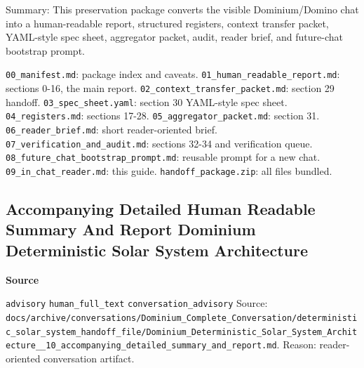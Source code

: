 \documentclass[9pt,a4paper,openany]{book}
\newcommand{\vonecallout}[3]{\par\medskip\noindent\begingroup\setlength{\fboxsep}{7pt}\colorbox{DomCalloutBg}{\parbox{0.94\linewidth}{\textbf{\textcolor{#1}{#2}}\par #3}}\endgroup\par\medskip}
\begin{document}
Summary: This preservation package converts the visible Dominium/\allowbreak{}Domino chat into a human-\allowbreak{}readable report, structured registers, context transfer packet, YAML-\allowbreak{}style spec sheet, aggregator packet, audit, reader brief, and future-\allowbreak{}chat bootstrap prompt.\allowbreak{}


\texttt{00\_\allowbreak{}manifest.\allowbreak{}md}: package index and caveats.\allowbreak{} \texttt{01\_\allowbreak{}human\_\allowbreak{}readable\_\allowbreak{}report.\allowbreak{}md}: sections 0-\allowbreak{}16, the main report.\allowbreak{} \texttt{02\_\allowbreak{}context\_\allowbreak{}transfer\_\allowbreak{}packet.\allowbreak{}md}: section 29 handoff.\allowbreak{} \texttt{03\_\allowbreak{}spec\_\allowbreak{}sheet.\allowbreak{}yaml}: section 30 YAML-\allowbreak{}style spec sheet.\allowbreak{} \texttt{04\_\allowbreak{}registers.\allowbreak{}md}: sections 17-\allowbreak{}28.\allowbreak{} \texttt{05\_\allowbreak{}aggregator\_\allowbreak{}packet.\allowbreak{}md}: section 31.\allowbreak{} \texttt{06\_\allowbreak{}reader\_\allowbreak{}brief.\allowbreak{}md}: short reader-\allowbreak{}oriented brief.\allowbreak{} \texttt{07\_\allowbreak{}verification\_\allowbreak{}and\_\allowbreak{}audit.\allowbreak{}md}: sections 32-\allowbreak{}34 and verification queue.\allowbreak{} \texttt{08\_\allowbreak{}future\_\allowbreak{}chat\_\allowbreak{}bootstrap\_\allowbreak{}prompt.\allowbreak{}md}: reusable prompt for a new chat.\allowbreak{} \texttt{09\_\allowbreak{}in\_\allowbreak{}chat\_\allowbreak{}reader.\allowbreak{}md}: this guide.\allowbreak{} \texttt{handoff\_\allowbreak{}package.\allowbreak{}zip}: all files bundled.\allowbreak{}



\subsection{Accompanying Detailed Human Readable Summary And Report Dominium Deterministic Solar System Architecture}

\vonecallout{DomSlate}{Source}{\texttt{advisory} \texttt{human\_\allowbreak{}full\_\allowbreak{}text} \texttt{conversation\_\allowbreak{}advisory} Source: \texttt{docs/\allowbreak{}archive/\allowbreak{}conversations/\allowbreak{}Dominium\_\allowbreak{}Complete\_\allowbreak{}Conversation/\allowbreak{}deterministic\_\allowbreak{}solar\_\allowbreak{}system\_\allowbreak{}handoff\_\allowbreak{}file/\allowbreak{}Dominium\_\allowbreak{}Deterministic\_\allowbreak{}Solar\_\allowbreak{}System\_\allowbreak{}Architecture\_\allowbreak{}\_\allowbreak{}10\_\allowbreak{}accompanying\_\allowbreak{}detailed\_\allowbreak{}summary\_\allowbreak{}and\_\allowbreak{}report.\allowbreak{}md}.\allowbreak{} Reason: reader-\allowbreak{}oriented conversation artifact.\allowbreak{}}
\end{document}
